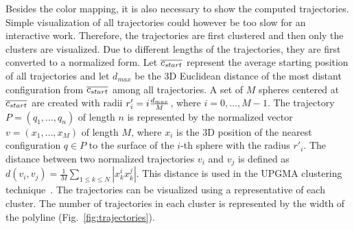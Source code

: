 \documentclass[letterpaper, 10 pt, conference]{ieeeconf} %
\begin{document}
Besides the color mapping, it is also necessary to show the computed trajectories.
Simple visualization of all trajectories could however be too slow for an interactive work.
Therefore, the trajectories are first clustered and then only the clusters are visualized.
Due to different lengths of the trajectories, they are first converted to a normalized form.
Let $\overline{c_{start}}$ represent the average starting position of all trajectories and let $d_{max}$ be the 3D Euclidean distance
of the most distant configuration from $\overline{c_{start}}$ among all trajectories.
A set of $M$ spheres centered at $\overline{c_{start}}$ are created with radii $r'_i=i {d_{max} \over M}$, where $i=0,\ldots, M-1$.
The trajectory $P=(q_1,\ldots,q_n)$ of length $n$ is represented by the normalized vector $v=(x_1,\ldots,x_M)$ of length $M$,
where $x_i$ is the 3D position of the nearest configuration $q \in P$ to the surface of the $i$-th sphere with the radius $r'_i$.
The distance between two normalized trajectories $v_i$ and $v_j$ is defined as
$d(v_i, v_j) = \frac{1}{M} \sum_{1 \leq k \leq N} |x_k^i x_k^j|$.
This distance is used in the UPGMA clustering technique~\cite{sokal1958statistical}.
The trajectories can be visualized using a representative of each cluster.
The number of trajectories in each cluster is represented by the width of the polyline (Fig.~\ref{fig:trajectories}).
\end{document}
